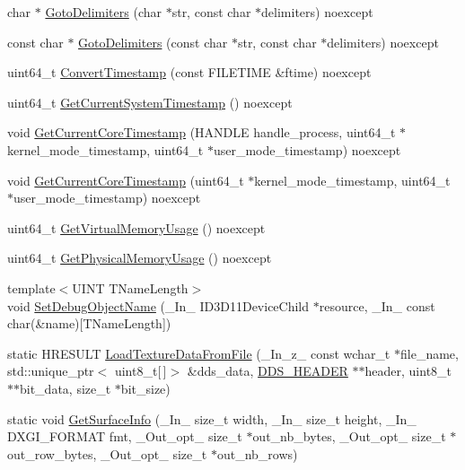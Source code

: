 \begin{DoxyCompactItemize}
\item 
char $\ast$ \hyperlink{namespacemage_abed6c81196ea839ac7533c7a93f3a3b7}{Goto\+Delimiters} (char $\ast$str, const char $\ast$delimiters) noexcept
\item 
const char $\ast$ \hyperlink{namespacemage_ac93c5058c9e47d5e27ab5cd487137e82}{Goto\+Delimiters} (const char $\ast$str, const char $\ast$delimiters) noexcept
\item 
uint64\+\_\+t \hyperlink{namespacemage_ad23a1e04334d7026888e9d47fc8ffd7e}{Convert\+Timestamp} (const F\+I\+L\+E\+T\+I\+ME \&ftime) noexcept
\item 
uint64\+\_\+t \hyperlink{namespacemage_ac067f505c046e7fb95fc62357eb2d0a3}{Get\+Current\+System\+Timestamp} () noexcept
\item 
void \hyperlink{namespacemage_a339a8fc07fb514a200a6198b69f50c28}{Get\+Current\+Core\+Timestamp} (H\+A\+N\+D\+LE handle\+\_\+process, uint64\+\_\+t $\ast$kernel\+\_\+mode\+\_\+timestamp, uint64\+\_\+t $\ast$user\+\_\+mode\+\_\+timestamp) noexcept
\item 
void \hyperlink{namespacemage_a47bc59593dc9596a853c5795da87743d}{Get\+Current\+Core\+Timestamp} (uint64\+\_\+t $\ast$kernel\+\_\+mode\+\_\+timestamp, uint64\+\_\+t $\ast$user\+\_\+mode\+\_\+timestamp) noexcept
\item 
uint64\+\_\+t \hyperlink{namespacemage_a4da7aaa2481f242b5c72fc13aa56a306}{Get\+Virtual\+Memory\+Usage} () noexcept
\item 
uint64\+\_\+t \hyperlink{namespacemage_a2befb49b95dd9bdc634e28222cde9f46}{Get\+Physical\+Memory\+Usage} () noexcept
\item 
{\footnotesize template$<$U\+I\+NT T\+Name\+Length$>$ }\\void \hyperlink{namespacemage_a88833e1a7c6ad614ff6e88cb10eff532}{Set\+Debug\+Object\+Name} (\+\_\+\+In\+\_\+ I\+D3\+D11\+Device\+Child $\ast$resource, \+\_\+\+In\+\_\+ const char(\&name)\mbox{[}T\+Name\+Length\mbox{]})
\item 
static H\+R\+E\+S\+U\+LT \hyperlink{namespacemage_ad1df9b8a27dd30528717777fd0c9c3db}{Load\+Texture\+Data\+From\+File} (\+\_\+\+In\+\_\+z\+\_\+ const wchar\+\_\+t $\ast$file\+\_\+name, std\+::unique\+\_\+ptr$<$ uint8\+\_\+t\mbox{[}$\,$\mbox{]}$>$ \&dds\+\_\+data, \hyperlink{structmage_1_1_d_d_s___h_e_a_d_e_r}{D\+D\+S\+\_\+\+H\+E\+A\+D\+ER} $\ast$$\ast$header, uint8\+\_\+t $\ast$$\ast$bit\+\_\+data, size\+\_\+t $\ast$bit\+\_\+size)
\item 
static void \hyperlink{namespacemage_a7b67bb6f38f3e787fb3561d236b88bd2}{Get\+Surface\+Info} (\+\_\+\+In\+\_\+ size\+\_\+t width, \+\_\+\+In\+\_\+ size\+\_\+t height, \+\_\+\+In\+\_\+ D\+X\+G\+I\+\_\+\+F\+O\+R\+M\+AT fmt, \+\_\+\+Out\+\_\+opt\+\_\+ size\+\_\+t $\ast$out\+\_\+nb\+\_\+bytes, \+\_\+\+Out\+\_\+opt\+\_\+ size\+\_\+t $\ast$out\+\_\+row\+\_\+bytes, \+\_\+\+Out\+\_\+opt\+\_\+ size\+\_\+t $\ast$out\+\_\+nb\+\_\+rows)

\end{DoxyCompactItemize}
